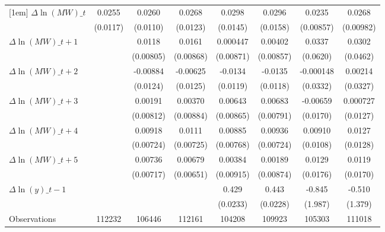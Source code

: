 {\begin{tabular}{l*{7}{c}}
[1em]
$\Delta \ln(MW)\_{t}$&   0.0255\sym{**} &   0.0260\sym{**} &   0.0268\sym{**} &   0.0298\sym{**} &   0.0296\sym{*}  &   0.0235\sym{***}&   0.0268\sym{***}\\
          & (0.0117)         & (0.0110)         & (0.0123)         & (0.0145)         & (0.0158)         &(0.00857)         &(0.00982)         \\
[1em]
$\Delta \ln(MW)\_{t+1}$&                  &   0.0118         &   0.0161\sym{*}  & 0.000447         &  0.00402         &   0.0337         &   0.0302         \\
          &                  &(0.00805)         &(0.00868)         &(0.00871)         &(0.00857)         & (0.0620)         & (0.0462)         \\
[1em]
$\Delta \ln(MW)\_{t+2}$&                  & -0.00884         & -0.00625         &  -0.0134         &  -0.0135         &-0.000148         &  0.00214         \\
          &                  & (0.0124)         & (0.0125)         & (0.0119)         & (0.0118)         & (0.0332)         & (0.0327)         \\
[1em]
$\Delta \ln(MW)\_{t+3}$&                  &  0.00191         &  0.00370         &  0.00643         &  0.00683         & -0.00659         & 0.000727         \\
          &                  &(0.00812)         &(0.00884)         &(0.00865)         &(0.00791)         & (0.0170)         & (0.0127)         \\
[1em]
$\Delta \ln(MW)\_{t+4}$&                  &  0.00918         &   0.0111         &  0.00885         &  0.00936         &  0.00910         &   0.0127         \\
          &                  &(0.00724)         &(0.00725)         &(0.00768)         &(0.00724)         & (0.0108)         & (0.0128)         \\
[1em]
$\Delta \ln(MW)\_{t+5}$&                  &  0.00736         &  0.00679         &  0.00384         &  0.00189         &   0.0129         &   0.0119         \\
          &                  &(0.00717)         &(0.00651)         &(0.00915)         &(0.00874)         & (0.0176)         & (0.0170)         \\
[1em]
$\Delta \ln(y)\_{t-1}$&                  &                  &                  &    0.429\sym{***}&    0.443\sym{***}&   -0.845         &   -0.510         \\
          &                  &                  &                  & (0.0233)         & (0.0228)         &  (1.987)         &  (1.379)         \\
\hline
Observations&   112232         &   106446         &   112161         &   104208         &   109923         &   105303         &   111018         \\
\hline\hline
\end{tabular}
}
